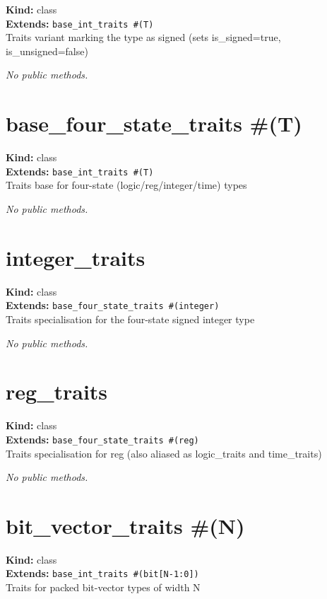 \documentclass[11pt,letterpaper]{report}
\begin{document}
\noindent\textbf{Kind:} class\\
\noindent\textbf{Extends:} \texttt{base\_int\_traits \#(T)}\\
\noindent Traits variant marking the type as signed (sets is\_signed=true, is\_unsigned=false)

\noindent\textit{No public methods.}


\section{base\_four\_state\_traits \#(T)}
\label{cls:basefourstatetraitsT}

\noindent\textbf{Kind:} class\\
\noindent\textbf{Extends:} \texttt{base\_int\_traits \#(T)}\\
\noindent Traits base for four-state (logic/reg/integer/time) types

\noindent\textit{No public methods.}


\section{integer\_traits}
\label{cls:integertraits}

\noindent\textbf{Kind:} class\\
\noindent\textbf{Extends:} \texttt{base\_four\_state\_traits \#(integer)}\\
\noindent Traits specialisation for the four-state signed integer type

\noindent\textit{No public methods.}


\section{reg\_traits}
\label{cls:regtraits}

\noindent\textbf{Kind:} class\\
\noindent\textbf{Extends:} \texttt{base\_four\_state\_traits \#(reg)}\\
\noindent Traits specialisation for reg (also aliased as logic\_traits and time\_traits)

\noindent\textit{No public methods.}


\section{bit\_vector\_traits \#(N)}
\label{cls:bitvectortraitsN}

\noindent\textbf{Kind:} class\\
\noindent\textbf{Extends:} \texttt{base\_int\_traits \#(bit[N-1:0])}\\
\noindent Traits for packed bit-vector types of width N
\end{document}

